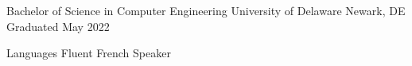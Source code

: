 \documentclass[11pt, letterpaper]{awesome-cv}
\begin{document}

\begin{cventries}

  \cventry
    {Bachelor of Science in Computer Engineering}
    {University of Delaware}
    {Newark, DE}
    {Graduated May 2022}
    {}

\end{cventries}

\begin{cvskills}

  \cvskill
    {Languages}
    {Fluent French Speaker}

\end{cvskills}
\end{document}
